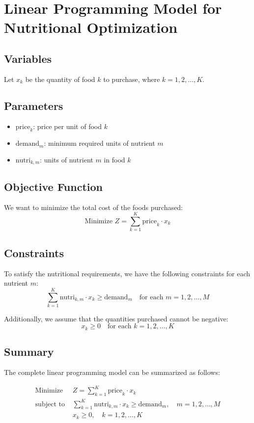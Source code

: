 \documentclass{article}
\begin{document}
\section*{Linear Programming Model for Nutritional Optimization}

\subsection*{Variables}
Let \( x_k \) be the quantity of food \( k \) to purchase, where \( k = 1, 2, \ldots, K \).

\subsection*{Parameters}
\begin{itemize}
    \item \( \text{price}_k \): price per unit of food \( k \)
    \item \( \text{demand}_m \): minimum required units of nutrient \( m \)
    \item \( \text{nutri}_{k,m} \): units of nutrient \( m \) in food \( k \)
\end{itemize}

\subsection*{Objective Function}
We want to minimize the total cost of the foods purchased:
\[
\text{Minimize } Z = \sum_{k=1}^K \text{price}_k \cdot x_k
\]

\subsection*{Constraints}
To satisfy the nutritional requirements, we have the following constraints for each nutrient \( m \):
\[
\sum_{k=1}^K \text{nutri}_{k,m} \cdot x_k \geq \text{demand}_m \quad \text{for each } m = 1, 2, \ldots, M
\]

Additionally, we assume that the quantities purchased cannot be negative:
\[
x_k \geq 0 \quad \text{for each } k = 1, 2, \ldots, K
\]

\subsection*{Summary}
The complete linear programming model can be summarized as follows:

\[
\begin{align*}
\text{Minimize } & Z = \sum_{k=1}^K \text{price}_k \cdot x_k \\
\text{subject to } & \sum_{k=1}^K \text{nutri}_{k,m} \cdot x_k \geq \text{demand}_m, \quad m = 1, 2, \ldots, M \\
& x_k \geq 0, \quad k = 1, 2, \ldots, K
\end{align*}
\]
\end{document}

